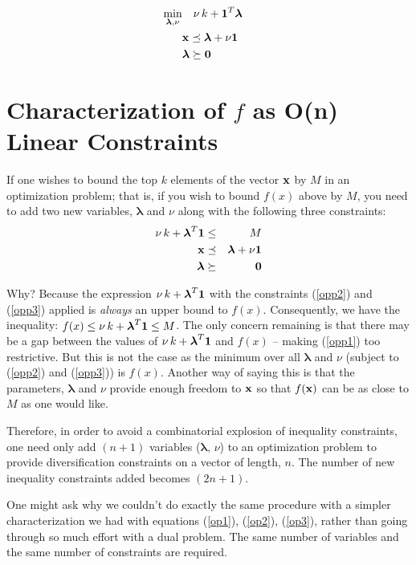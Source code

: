\documentclass[12pt]{article}
\begin{document}
\begin{eqnarray}
	\mathop{\rm min}_{{\boldsymbol \lambda}, \nu} & \quad \nu \, k + {\bf 1}^T {\boldsymbol \lambda} & \\ 
												  &  {\bf x} \preceq {\boldsymbol \lambda} + \nu {\bf 1} & \\
												  & {\boldsymbol \lambda} \succeq {\bf 0} & 
 \end{eqnarray}

\section{Characterization of $f$ as O(n) Linear Constraints}
If one wishes to bound the top $k$ elements of the vector ${\bf x}$ by $M$ in 
an optimization problem; that is, if you wish to bound $f(x)$ above by $M$, you 
need to add two new variables, ${\boldsymbol \lambda}$ and $\nu$ along with 
the following three constraints:
\begin{eqnarray}
	\nu \, k + {\boldsymbol \lambda}^T {\bf 1}  & \le & M \label{opp1} \\ 
	{\bf x} & \preceq & {\boldsymbol \lambda} + \nu {\bf 1} \label{opp2} \\
	{\boldsymbol \lambda} & \succeq & {\bf 0}  \label{opp3}
\end{eqnarray}

Why? Because the expression $\nu \, k + {\boldsymbol \lambda}^T {\bf 1}$ with
the constraints (\ref{opp2}) and (\ref{opp3}) applied is {\it always\/} 
an upper bound to $f(x)$. 
Consequently, we have the inequality: 
$f(x) \le \nu \, k + {\boldsymbol \lambda}^T {\bf 1} \le M$.
The only concern remaining is that there may be a gap between the values of 
$\nu \, k + {\boldsymbol \lambda}^T {\bf 1}$ 
and $f(x)$ -- making (\ref{opp1}) too restrictive. 
But this is not the case as the minimum over all ${\boldsymbol \lambda}$ 
and $\nu$ (subject to (\ref{opp2}) and (\ref{opp3})) is $f(x)$.
Another way of saying this is that the parameters, ${\boldsymbol \lambda}$ and $\nu$
provide enough freedom to ${\bf x}$ so that $f({\bf x})$ can be as close to $M$ as one would like.

Therefore, in order to avoid a combinatorial explosion of inequality constraints, 
one need only add $(n+1)$ variables (${\boldsymbol \lambda}, \, \nu$) to an 
optimization problem to provide diversification constraints on a vector of length, $n$.
The number of new inequality constraints added becomes $(2n+1)$.

One might ask why we couldn't do exactly the same procedure with a simpler characterization we had 
with equations
(\ref{op1}), (\ref{op2}), (\ref{op3}), rather than going through so much effort with a dual problem.
The same number of variables and the same number of constraints are required.
\end{document}
